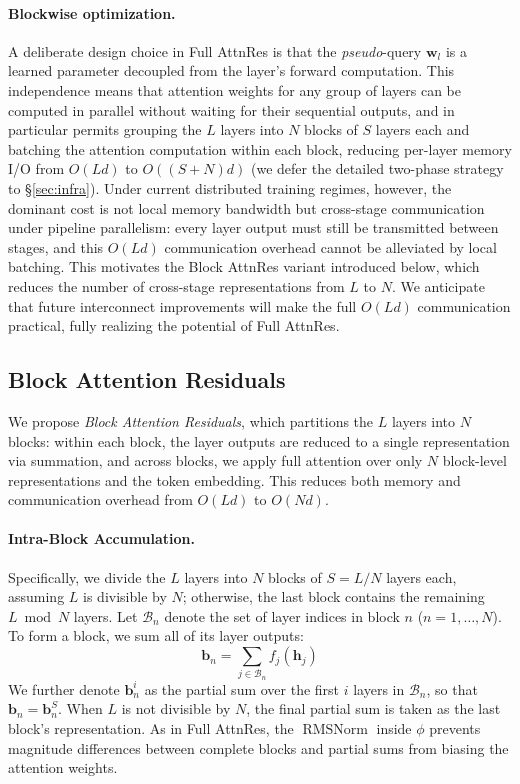 \paragraph{Blockwise optimization.}
A deliberate design choice in Full AttnRes is that the \emph{pseudo}-query $\bm{w}_l$ is a learned parameter decoupled from the layer's forward computation. This independence means that attention weights for any group of layers can be computed in parallel without waiting for their sequential outputs, and in particular permits grouping the $L$ layers into $N$ blocks of $S$ layers each and batching the attention computation within each block, reducing per-layer memory I/O from $O(Ld)$ to $O((S{+}N)d)$ (we defer the detailed two-phase strategy to \S\ref{sec:infra}). Under current distributed training regimes, however, the dominant cost is not local memory bandwidth but cross-stage communication under pipeline parallelism: every layer output must still be transmitted between stages, and this $O(Ld)$ communication overhead cannot be alleviated by local batching. This motivates the Block AttnRes variant introduced below, which reduces the number of cross-stage representations from $L$ to $N$. We anticipate that future interconnect improvements will make the full $O(Ld)$ communication practical, fully realizing the potential of Full AttnRes.

\subsection{Block Attention Residuals}

We propose \emph{Block Attention Residuals}, which partitions the $L$ layers into $N$ blocks: within each block, the layer outputs are reduced to a single representation via summation, and across blocks, we apply full attention over only $N$ block-level representations and the token embedding. This reduces both memory and communication overhead from $O(Ld)$ to $O(Nd)$.

\paragraph{Intra-Block Accumulation.}
Specifically, we divide the $L$ layers into $N$ blocks of $S = L/N$ layers each, assuming $L$ is divisible by $N$; otherwise, the last block contains the remaining $L \bmod N$ layers. Let $\mathcal{B}_n$ denote the set of layer indices in block $n$ ($n = 1, \ldots, N$).
To form a block, we sum all of its layer outputs:
\begin{equation}
    \bm{b}_n = \sum_{j \in \mathcal{B}_n} f_j(\bm{h}_j)
\end{equation}
We further denote $\bm{b}_n^i$ as the partial sum over the first $i$ layers in $\mathcal{B}_n$, so that $\bm{b}_n = \bm{b}_n^{S}$.
When $L$ is not divisible by $N$, the final partial sum is taken as the last block's representation.
As in Full AttnRes, the $\operatorname{RMSNorm}$ inside $\phi$  prevents magnitude differences between complete blocks and partial sums from biasing the attention weights.

